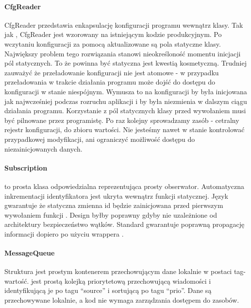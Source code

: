 \paragraph{CfgReader}
CfgReader przedstawia enkapsulację konfiguracji programu wewnątrz klasy. Tak jak , CfgReader jest wzorowany na istniejącym kodzie produkcyjnym. Po wczytaniu konfiguracji za pomocą  aktualizowane są pola statyczne klasy. Największy problem tego rozwiązania stanowi nieokreśloność momentu inicjacji pól statycznych. To że  powinna być statyczna jest kwestią kosmetyczną. Trudniej zauważyć że przeładowanie konfiguracji nie jest atomowe - w przypadku przeładowania w trakcie działania programu może dojść do dostępu do konfiguracji w stanie niespójnym. Wymusza to na konfiguracji by była inicjowana jak najwcześniej podczas rozruchu aplikacji i by była niezmienia w dalszym ciągu działania programu. Korzystanie z pól statycznych klasy przed wywołaniem  musi być pilnowane przez programistę. Po raz kolejny sprowadzamy zasób - cetralny rejestr konfiguracji, do zbioru wartości. Nie jesteśmy nawet w stanie kontrolować przypadkowej modyfikacji, ani ograniczyć możliwość dostępu do niezainicjowanych danych.
\\
\paragraph{Subscription}
 to prosta klasa odpowiedzialna reprezentująca prosty obserwator. Automatyczna inkrementacji identyfikatora jest ukryta wewnątrz funkcji statycznej. Język gwarantuje że statyczna zmienna id będzie zainicjowana przed pierwszym wywołaniem funkcji . Design byłby poprawny gdyby nie uzależnione od architektury bezpieczeństwo wątków. Standard gwarantuje poprawną propagację informacji dopiero po użyciu wrappera .
\\
\paragraph{MessageQueue}
Struktura  jest prostym kontenerem przechowującym dane lokalnie w postaci tag-wartość.
 jest prostą kolejką priorytetową przechowującą wiadomości i identyfikującą je po tagu ``source'' i sortującą po tagu ``prio''. Dane są przechowywane lokalnie, a kod nie wymaga zarządzania dostępem do zasobów.
\\
